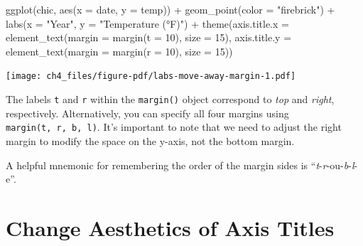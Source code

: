 \documentclass[
  letterpaper,
]{scrbook}
\newenvironment{Shaded}{\begin{snugshade}}{\end{snugshade}}
\newcommand{\AttributeTok}[1]{\textcolor[rgb]{0.40,0.45,0.13}{#1}}
\newcommand{\DecValTok}[1]{\textcolor[rgb]{0.68,0.00,0.00}{#1}}
\newcommand{\FunctionTok}[1]{\textcolor[rgb]{0.28,0.35,0.67}{#1}}
\newcommand{\NormalTok}[1]{\textcolor[rgb]{0.00,0.23,0.31}{#1}}
\newcommand{\SpecialCharTok}[1]{\textcolor[rgb]{0.37,0.37,0.37}{#1}}
\newcommand{\StringTok}[1]{\textcolor[rgb]{0.13,0.47,0.30}{#1}}
\begin{document}
\begin{Shaded}
\begin{Highlighting}[]
\FunctionTok{ggplot}\NormalTok{(chic, }\FunctionTok{aes}\NormalTok{(}\AttributeTok{x =}\NormalTok{ date, }\AttributeTok{y =}\NormalTok{ temp)) }\SpecialCharTok{+}
  \FunctionTok{geom\_point}\NormalTok{(}\AttributeTok{color =} \StringTok{"firebrick"}\NormalTok{) }\SpecialCharTok{+}
  \FunctionTok{labs}\NormalTok{(}\AttributeTok{x =} \StringTok{"Year"}\NormalTok{, }\AttributeTok{y =} \StringTok{"Temperature (°F)"}\NormalTok{) }\SpecialCharTok{+}
  \FunctionTok{theme}\NormalTok{(}\AttributeTok{axis.title.x =} \FunctionTok{element\_text}\NormalTok{(}\AttributeTok{margin =} \FunctionTok{margin}\NormalTok{(}\AttributeTok{t =} \DecValTok{10}\NormalTok{), }\AttributeTok{size =} \DecValTok{15}\NormalTok{),}
        \AttributeTok{axis.title.y =} \FunctionTok{element\_text}\NormalTok{(}\AttributeTok{margin =} \FunctionTok{margin}\NormalTok{(}\AttributeTok{r =} \DecValTok{10}\NormalTok{), }\AttributeTok{size =} \DecValTok{15}\NormalTok{))}
\end{Highlighting}
\end{Shaded}

\texttt{[image: ch4\_files/figure-pdf/labs-move-away-margin-1.pdf]}

The labels \texttt{t} and \texttt{r} within the \texttt{margin()} object
correspond to \emph{top} and \emph{right}, respectively. Alternatively,
you can specify all four margins using \texttt{margin(t,\ r,\ b,\ l)}.
It's important to note that we need to adjust the right margin to modify
the space on the y-axis, not the bottom margin.

\begin{tcolorbox}[enhanced jigsaw, rightrule=.15mm, arc=.35mm, title=\textcolor{quarto-callout-tip-color}{\faLightbulb}\hspace{0.5em}{Having trouble with Margins?}, colback=white, toptitle=1mm, colbacktitle=quarto-callout-tip-color!10!white, breakable, left=2mm, opacityback=0, leftrule=.75mm, bottomrule=.15mm, bottomtitle=1mm, colframe=quarto-callout-tip-color-frame, coltitle=black, toprule=.15mm, opacitybacktitle=0.6, titlerule=0mm]

A helpful mnemonic for remembering the order of the margin sides is
``\emph{t}-\emph{r}-ou-\emph{b}-\emph{l}-e''.

\end{tcolorbox}

\section{Change Aesthetics of Axis
Titles}\label{change-aesthetics-of-axis-titles}
\end{document}

